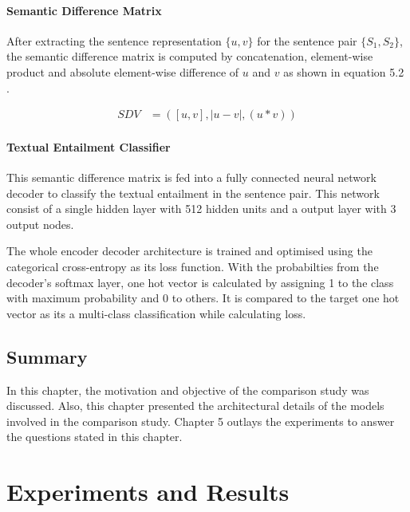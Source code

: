 \documentclass[12pt]{report} %
\begin{document}
	\subsubsection{Semantic Difference Matrix}
	
	After extracting the sentence representation $\{u,v\}$  for the sentence pair $\{S_{1},S_{2}\}$, the semantic difference matrix is computed by concatenation, element-wise product and absolute element-wise difference of $u$ and $v$ as shown in equation 5.2 .
	
	\begin{align} 
	SDV & =([u,v],|u - v|,(u \ast v)) 
	\end{align}
	
	\subsubsection{Textual Entailment Classifier}
	
	This semantic difference matrix is fed into a fully connected neural network decoder to classify the textual entailment in the sentence pair. This network consist of a single hidden layer with 512 hidden units and a output layer with 3 output nodes. 
	
	The whole encoder decoder architecture is trained  and optimised using the categorical cross-entropy as its loss function. With the probabilties from the decoder's softmax layer, one hot vector is calculated by assigning 1 to the class with maximum probability and 0 to others. It is compared to the target one hot vector as its a multi-class classification while calculating loss.
	
	\section{Summary}
	In this chapter, the motivation and objective of the comparison study was discussed. Also, this chapter presented the architectural details of the models involved in the comparison study. Chapter 5 outlays the experiments to answer the questions stated in this chapter.
	
	  
	 
\chapter{Experiments and Results}
\label{results}
\end{document}

